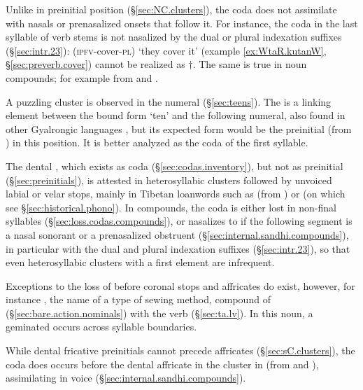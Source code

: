 Unlike  in preinitial position (§\ref{sec:NC.clusters}), the coda  does not assimilate with nasals or prenasalized onsets that follow it. For instance,  the coda  in the last syllable of verb stems is not nasalized by the dual  or plural  indexation suffixes (§\ref{sec:intr.23}):  (\textsc{ipfv}-cover-\textsc{pl}) `they cover it' (example \ref{ex:WtaR.kutanW}, §\ref{sec:preverb.cover}) cannot be realized as $\dagger$. The same is true in noun compounds; for example  from  and .

A puzzling cluster  is observed in the numeral  (§\ref{sec:teens}). The  is a linking element between the bound form  `ten' and the following numeral, also found in other Gyalrongic languages \citep{jacques17num}, but its expected form would be the preinitial  (from ) in this position. It is better analyzed as the coda of the first syllable.

The dental , which exists as coda (§\ref{sec:codas.inventory}), but not as preinitial (§\ref{sec:preinitials}), is attested in heterosyllabic clusters followed by unvoiced labial or velar stops, mainly in Tibetan loanwords such as  (from ) or  (on which see §\ref{sec:historical.phono}). In compounds, the coda  is either lost in non-final syllables (§\ref{sec:loss.codas.compounds}), or nasalizes to  if the following segment is a nasal sonorant or a prenasalized obstruent (§\ref{sec:internal.sandhi.compounds}), in particular with the dual  and plural  indexation suffixes (§\ref{sec:intr.23}), so that even heterosyllabic clusters with  a first element are infrequent. 

Exceptions to the loss of  before coronal stops and affricates do exist, however, for instance , the name of a type of sewing method, compound of  (§\ref{sec:bare.action.nominals}) with the verb  (§\ref{sec:ta.lv}). In this noun, a geminated  occurs across syllable boundaries.

While dental fricative preinitials cannot precede affricates (§\ref{sec:sC.clusters}), the coda  does occurs before the dental affricate  in the cluster  in  (from  and ), assimilating in voice (§\ref{sec:internal.sandhi.compounds}).

